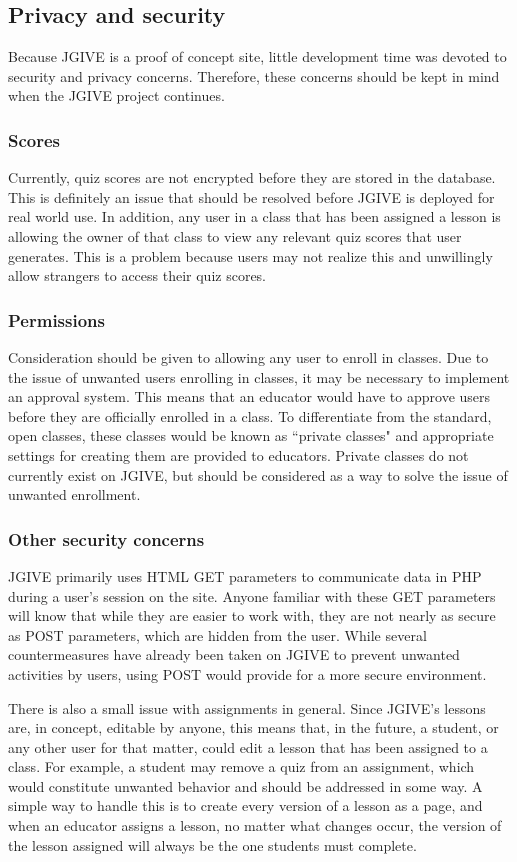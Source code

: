\documentclass{acm_proc_article-sp}
\begin{document}
\subsection{Privacy and security}
Because JGIVE is a proof of concept site, little development time was devoted to security and privacy concerns. Therefore, these concerns should be kept in mind when the JGIVE project continues.

\subsubsection{Scores}
Currently, quiz scores are not encrypted before they are stored in the database. This is definitely an issue that should be resolved before JGIVE is deployed for real world use. In addition, any user in a class that has been assigned a lesson is allowing the owner of that class to view any relevant quiz scores that user generates. This is a problem because users may not realize this and unwillingly allow strangers to access their quiz scores.

\subsubsection{Permissions}
Consideration should be given to allowing any user to enroll in classes. Due to the issue of unwanted users enrolling in classes, it may be necessary to implement an approval system. This means that an educator would have to approve users before they are officially enrolled in a class. To differentiate from the standard, open classes, these classes would be known as ``private classes" and appropriate settings for creating them are provided to educators. Private classes do not currently exist on JGIVE, but should be considered as a way to solve the issue of unwanted enrollment.

\subsubsection{Other security concerns}
JGIVE primarily uses HTML GET parameters to communicate data in PHP during a user's session on the site. Anyone familiar with these GET parameters will know that while they are easier to work with, they are not nearly as secure as POST parameters, which are hidden from the user. While several countermeasures have already been taken on JGIVE to prevent unwanted activities by users, using POST would provide for a more secure environment.

There is also a small issue with assignments in general. Since JGIVE's lessons are, in concept, editable by anyone, this means that, in the future, a student, or any other user for that matter, could edit a lesson that has been assigned to a class. For example, a student may remove a quiz from an assignment, which would constitute unwanted behavior and should be addressed in some way. A simple way to handle this is to create every version of a lesson as a page, and when an educator assigns a lesson, no matter what changes occur, the version of the lesson assigned will always be the one students must complete.
\end{document}
